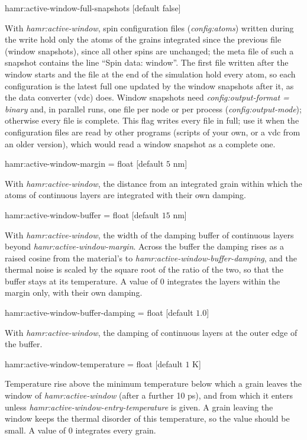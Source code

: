 {\zicf hamr:active-window-full-snapshots [default false]}
With \textit{hamr:active-window}, spin configuration files (\textit{config:atoms}) written during the write hold only the atoms of the grains integrated since the previous file (window snapshots), since all other spins are unchanged; the meta file of such a snapshot contains the line ``Spin data: window''. The first file written after the window starts and the file at the end of the simulation hold every atom, so each configuration is the latest full one updated by the window snapshots after it, as the data converter (vdc) does. Window snapshots need \textit{config:output-format = binary} and, in parallel runs, one file per node or per process (\textit{config:output-mode}); otherwise every file is complete. This flag writes every file in full; use it when the configuration files are read by other programs (scripts of your own, or a vdc from an older version), which would read a window snapshot as a complete one.

{\zicf hamr:active-window-margin = float [default $5$ nm]}
With \textit{hamr:active-window}, the distance from an integrated grain within which the atoms of continuous layers are integrated with their own damping.

{\zicf hamr:active-window-buffer = float [default $15$ nm]}
With \textit{hamr:active-window}, the width of the damping buffer of continuous layers beyond \textit{hamr:active-window-margin}. Across the buffer the damping rises as a raised cosine from the material's to \textit{hamr:active-window-buffer-damping}, and the thermal noise is scaled by the square root of the ratio of the two, so that the buffer stays at its temperature. A value of 0 integrates the layers within the margin only, with their own damping.

{\zicf hamr:active-window-buffer-damping = float [default $1.0$]}
With \textit{hamr:active-window}, the damping of continuous layers at the outer edge of the buffer.

{\zicf hamr:active-window-temperature = float [default $1$ K]}
Temperature rise above the minimum temperature below which a grain leaves the window of \textit{hamr:active-window} (after a further 10 ps), and from which it enters unless \textit{hamr:active-window-entry-temperature} is given. A grain leaving the window keeps the thermal disorder of this temperature, so the value should be small. A value of 0 integrates every grain.

